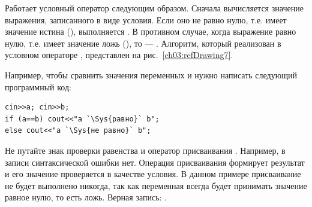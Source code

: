 Работает условный оператор следующим образом. Сначала вычисляется значение выражения, записанного в виде условия. Если
оно не равно нулю, т.е. имеет значение истина (), выполняется . В
противном случае, когда выражение равно нулю, т.е. имеет значение ложь (), то ---
. Алгоритм, который реализован в условном операторе , представлен на
рис.~\ref{ch03:refDrawing7}.


Например, чтобы сравнить значения переменных  и  нужно написать следующий
программный код:
\begin{lstlisting}
cin>>a; cin>>b;
if (a==b) cout<<"a `\Sys{равно}` b";
else cout<<"a `\Sys{не равно}` b";
\end{lstlisting}

 Не путайте знак проверки равенства \Sys{==} и оператор присваивания
\Sys{=}. Например, в записи  синтаксической ошибки нет. Операция
присваивания  формирует результат и его значение проверяется в качестве условия. В данном примере
присваивание  не будет выполнено никогда, так как переменная  всегда будет
принимать значение равное нулю, то есть ложь. Верная запись: 
.

